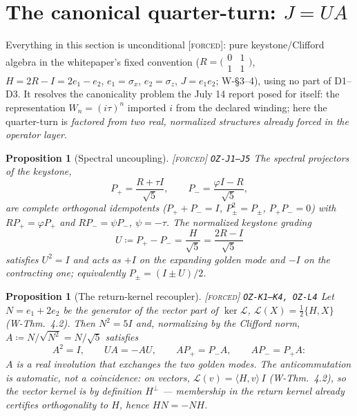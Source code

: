 \documentclass[11pt]{article}
\newcommand{\tagF}{\textcolor{cF}{\textsc{[forced]}}}
\newcommand{\hx}[1]{\textcolor{cC}{\footnotesize\texttt{#1}}}
\newcommand{\gp}{\varphi}
\theoremstyle{plain}
\newtheorem{proposition}[theorem]{Proposition}
\theoremstyle{definition}
\theoremstyle{remark}
\begin{document}
\section{The canonical quarter-turn: $J=UA$}\label{sec:quarterturn}

Everything in this section is unconditional \tagF{}: pure keystone/Clifford
algebra in the whitepaper's fixed convention
($R=\bigl(\begin{smallmatrix}0&1\\1&1\end{smallmatrix}\bigr)$, $H=2R-I=2e_1-e_2$,
$e_1=\sigma_x$, $e_2=\sigma_z$, $J=e_1e_2$; W-\S3--4), using no part of D1--D3.
It resolves the canonicality problem the July 14 report posed for itself: the
representation $W_n=(i\tau)^n$ imported $i$ from the declared winding; here the
quarter-turn is \emph{factored from two real, normalized structures already
forced in the operator layer}.

\begin{proposition}[Spectral uncoupling]\label{prop:uncouple}\tagF{} \hx{OZ-J1--J5}
The spectral projectors of the keystone,
\[
P_+=\frac{R+\tau I}{\sqrt5},\qquad P_-=\frac{\gp I-R}{\sqrt5},
\]
are complete orthogonal idempotents ($P_++P_-=I$, $P_\pm^2=P_\pm$, $P_+P_-=0$)
with $RP_+=\gp P_+$ and $RP_-=\psi P_-$, $\psi=-\tau$. The normalized
\emph{keystone grading}
\[
U \coloneqq P_+-P_-=\frac{H}{\sqrt5}=\frac{2R-I}{\sqrt5}
\]
satisfies $U^2=I$ and acts as $+I$ on the expanding golden mode and $-I$ on the
contracting one; equivalently $P_\pm=(I\pm U)/2$.
\end{proposition}

\begin{proposition}[The return-kernel recoupler]\label{prop:recoupler}\tagF{} \hx{OZ-K1--K4, OZ-L4}
Let $N=e_1+2e_2$ be the generator of the vector part of $\ker\mathcal L$,
$\mathcal L(X)=\tfrac12\{H,X\}$ (W-Thm.\ 4.2). Then $N^2=5I$ and, normalizing by
the Clifford norm, $A \coloneqq N/\sqrt{N^2}=N/\sqrt5$ satisfies
\[
A^2=I,\qquad UA=-AU,\qquad AP_+=P_-A,\qquad AP_-=P_+A :
\]
$A$ is a real involution that \emph{exchanges} the two golden modes. The
anticommutation is automatic, not a coincidence: on vectors,
$\mathcal L(v)=\langle H,v\rangle\,I$ (W-Thm.\ 4.2), so the vector kernel is
\emph{by definition} $H^\perp$ --- membership in the return kernel already
certifies orthogonality to $H$, hence $HN=-NH$.
\end{proposition}
\end{document}
